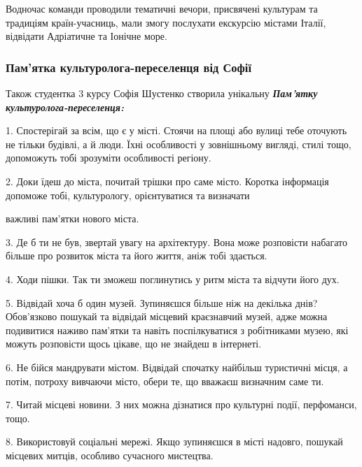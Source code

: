 
Водночас команди проводили тематичні вечори, присвячені культурам та традиціям
країн-учасниць, мали змогу послухати екскурсію містами Італії, відвідати
Адріатичне та Іонічне море.


\subsubsection{Пам'ятка культуролога-переселенця від Софії}

Також студентка 3 курсу Софія Шустенко створила унікальну \emph{\textbf{Пам'ятку культуролога-переселенця:}}


1. Спостерігай за всім, що є у місті. Стоячи на площі або вулиці тебе оточують
не тільки будівлі, а й люди. Їхні особливості у зовнішньому вигляді, стилі
тощо, допоможуть тобі зрозуміти особливості регіону.

2. Доки їдеш до міста, почитай трішки про саме місто. Коротка інформація
допоможе тобі, культурологу, орієнтуватися та визначати\par\noindent важливі пам'ятки нового
міста.

3. Де б ти не був, звертай увагу на архітектуру. Вона може розповісти набагато
більше про розвиток міста та його життя, аніж тобі здається.

4. Ходи пішки. Так ти зможеш поглинутись у ритм міста та відчути його дух.

5. Відвідай хоча б один музей. Зупиняєшся більше ніж на декілька днів?
Обов'язково пошукай та відвідай місцевий краєзнавчий музей, адже можна
подивитися наживо пам'ятки та навіть поспілкуватися з робітниками музею, які
можуть розповісти щось цікаве, що не знайдеш в інтернеті.

6. Не бійся мандрувати містом. Відвідай спочатку найбільш туристичні місця, а
потім, потроху вивчаючи місто, обери те, що вважаєш визначним саме ти.

7. Читай місцеві новини. З них можна дізнатися про культурні події, перфоманси,
тощо.

8. Використовуй соціальні мережі. Якщо зупиняєшся в місті надовго, пошукай
місцевих митців, особливо сучасного мистецтва.

